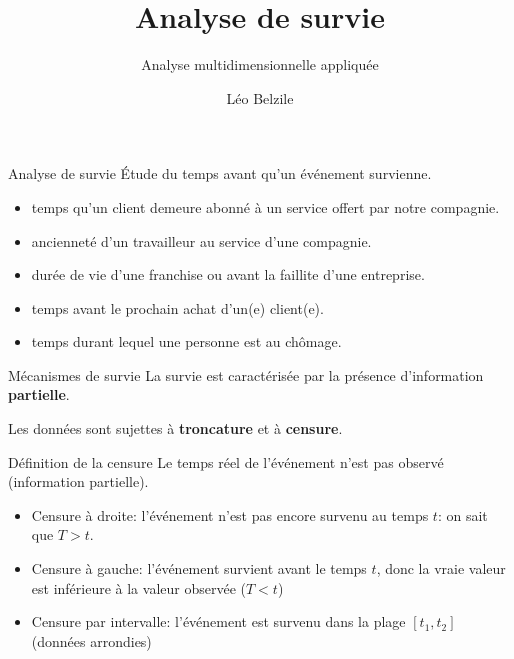 \documentclass[
  ignorenonframetext,
]{beamer}
\title{Analyse de survie}
\subtitle{Analyse multidimensionnelle appliquée}
\author{Léo Belzile}
\date{}
\institute{HEC Montréal}
\providecommand{\tightlist}{%
  \setlength{\itemsep}{0pt}\setlength{\parskip}{0pt}}\usepackage{longtable,booktabs,array}
\begin{document}
\frame{\titlepage}
\ifdefined\Shaded\renewenvironment{Shaded}{\begin{tcolorbox}[boxrule=0pt, interior hidden, frame hidden, sharp corners, borderline west={3pt}{0pt}{shadecolor}, enhanced, breakable]}{\end{tcolorbox}}\fi

\begin{frame}{Analyse de survie}
\protect\hypertarget{analyse-de-survie}{}
Étude du temps avant qu'un événement survienne.

\begin{itemize}
\tightlist
\item
  temps qu'un client demeure abonné à un service offert par notre
  compagnie.
\item
  ancienneté d'un travailleur au service d'une compagnie.
\item
  durée de vie d'une franchise ou avant la faillite d'une entreprise.
\item
  temps avant le prochain achat d'un(e) client(e).
\item
  temps durant lequel une personne est au chômage.
\end{itemize}
\end{frame}

\begin{frame}{Mécanismes de survie}
\protect\hypertarget{muxe9canismes-de-survie}{}
La survie est caractérisée par la présence d'information
\textbf{partielle}.

Les données sont sujettes à \textbf{troncature} et à \textbf{censure}.
\end{frame}

\begin{frame}{Définition de la censure}
\protect\hypertarget{duxe9finition-de-la-censure}{}
Le temps réel de l'événement n'est pas observé (information partielle).

\begin{itemize}
\tightlist
\item
  Censure à droite: l'événement n'est pas encore survenu au temps \(t\):
  on sait que \(T > t\).
\item
  Censure à gauche: l'événement survient avant le temps \(t\), donc la
  vraie valeur est inférieure à la valeur observée (\(T < t\))
\item
  Censure par intervalle: l'événement est survenu dans la plage
  \([t_1, t_2]\) (données arrondies)
\end{itemize}
\end{frame}
\end{document}
